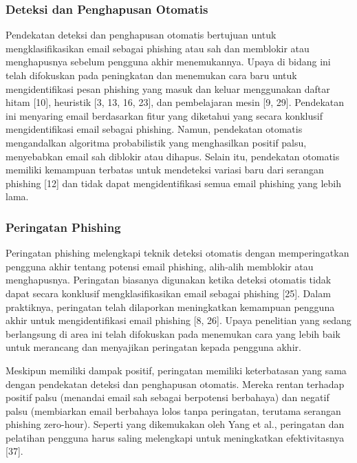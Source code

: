\documentclass[lettersize,journal]{IEEEtran}
\begin{document}
\subsubsection{Deteksi dan Penghapusan Otomatis}
Pendekatan deteksi dan penghapusan otomatis bertujuan untuk mengklasifikasikan
email sebagai phishing atau sah dan memblokir atau menghapusnya sebelum
pengguna akhir menemukannya. Upaya di bidang ini telah difokuskan pada
peningkatan dan menemukan cara baru untuk mengidentifikasi pesan phishing yang
masuk dan keluar menggunakan daftar hitam [10], heuristik [3, 13, 16, 23], dan
pembelajaran mesin [9, 29]. Pendekatan ini menyaring email berdasarkan fitur
yang diketahui yang secara konklusif mengidentifikasi email sebagai phishing.
Namun, pendekatan otomatis mengandalkan algoritma probabilistik yang
menghasilkan positif palsu, menyebabkan email sah diblokir atau dihapus. Selain
itu, pendekatan otomatis memiliki kemampuan terbatas untuk mendeteksi variasi
baru dari serangan phishing [12] dan tidak dapat mengidentifikasi semua email
phishing yang lebih lama.

\subsubsection{Peringatan Phishing}
Peringatan phishing melengkapi teknik deteksi otomatis dengan memperingatkan
pengguna akhir tentang potensi email phishing, alih-alih memblokir atau
menghapusnya. Peringatan biasanya digunakan ketika deteksi otomatis tidak dapat
secara konklusif mengklasifikasikan email sebagai phishing [25]. Dalam
praktiknya, peringatan telah dilaporkan meningkatkan kemampuan pengguna akhir
untuk mengidentifikasi email phishing [8, 26]. Upaya penelitian yang sedang
berlangsung di area ini telah difokuskan pada menemukan cara yang lebih baik
untuk merancang dan menyajikan peringatan kepada pengguna akhir.

Meskipun memiliki dampak positif, peringatan memiliki keterbatasan yang sama
dengan pendekatan deteksi dan penghapusan otomatis. Mereka rentan terhadap
positif palsu (menandai email sah sebagai berpotensi berbahaya) dan negatif
palsu (membiarkan email berbahaya lolos tanpa peringatan, terutama serangan
phishing zero-hour). Seperti yang dikemukakan oleh Yang et al., peringatan dan
pelatihan pengguna harus saling melengkapi untuk meningkatkan efektivitasnya
  [37].
\end{document}
